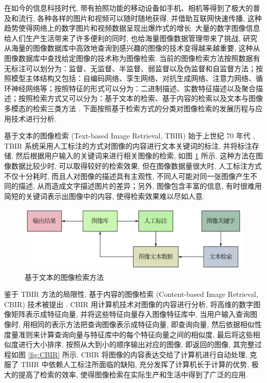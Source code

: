 \documentclass[12pt]{article}
\begin{document}
在如今的信息科技时代, 带有拍照功能的移动设备如手机、相机等得到了极大的普及和流行, 各种各样的图片和视频可以随时随地获得, 并借助互联网快速传播, 这种趋势使得网络上的数字图片和视频数据呈现出爆炸式的增长. 大量的数字图像信息给人们生产生活带来了许多便利的同时, 也给海量图像数据管理带来了挑战, 研究从海量的图像数据库中高效地查询到感兴趣的图像的技术变得越来越重要, 这种从图像数据库中查找给定图像的技术称为图像检索. 当前的图像检索方法按照数据有无标注可以划分为：监督、无监督、半监督、弱监督以及伪监督和自监督方法；按照模型主体结构又包括：自编码网络、孪生网络、对抗生成网络、注意力网络、循环神经网络等；按照特征的形式可以分为：二进制描述、实数特征描述以及聚合描述；按照检索方式又可以分为：基于文本的检索、基于内容的检索以及文本与图像多模态的检索三类方法 \cite{Dubey2020Decade}. 下面按照基于检索方式的分类对图像检索的发展历程与应用技术进行分析. 

基于文本的图像检索 (Text-based Image Retrieval, TBIR) 始于上世纪 70 年代 \cite{Hwang2012Medical,Alkhawlani2015Text}, TBIR 系统采用人工标注的方式对图像的内容进行文本关键词的标注, 并将标注存储, 然后根据用户输入的关键词来进行相关图像的检索, 如图 \ref{fig:TBIR} 所示. 这种方法在图像数据比较少时, 可以取得较好的检索效果, 但在图像数据量很大时, 人工标注方式不仅十分耗时, 而且人对图像的描述具有主观性, 不同人可能对同一张图像产生不同的描述, 从而造成文字描述图片的差异；另外, 图像包含丰富的信息, 有时很难用简短的关键词表示出图像中的内容, 使得检索效果难以尽如人意. 

\begin{figure}[htbp]
  \centering
  \includegraphics[width=12cm]{TBIR.png}
  \caption{基于文本的图像检索方法}
  \label{fig:TBIR}
\end{figure}

鉴于 TBIR 方法的局限性, 基于内容的图像检索 (Content-based Image Retrieval, CBIR) 技术被提出 \cite{Kato1992Database} . CBIR 用计算机技术对图像的内容进行分析, 将高维的数字图像矩阵表示成特征向量, 并将这些特征向量存入图像特征库中, 当用户输入查询图像时, 用相同的表示方法把查询图像表示成特征向量, 即查询向量, 然后依据相似性度量准则来计算查询向量与特征库中的每个特征向量之间的相似度, 最后将这些相似度进行大小排序, 按照从大到小的顺序输出对应的图像, 即返回的图像, 其完整过程如图 \ref{fig:CBIR} 所示. CBIR 将图像的内容表达交给了计算机进行自动处理, 克服了 TBIR 中依赖人工标注所面临的缺陷, 充分发挥了计算机长于计算的优势, 极大的提高了检索的效率, 使得图像检索在实际生产和生活中得到了广泛的应用.  
\end{document}
